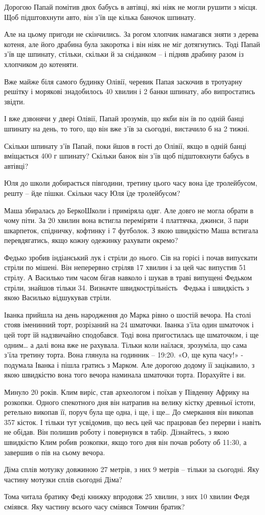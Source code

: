 Дорогою Папай помітив двох бабусь в автівці, які ніяк не могли рушити
з місця. Щоб підштовхнути авто, він з’їв ще кілька баночок шпинату.

Але на цьому пригоди не скінчились. За рогом хлопчик намагався зняти
з дерева котеня, але його драбина була закоротка і він ніяк не міг
дотягнутись. Тоді Папай з’їв ще шпинату, стільки, скільки й
за сніданком – і підняв драбину разом із хлопчиком до котеняти.

Вже майже біля самого будинку Олівії, черевик Папая заскочив в тротуарну
решітку і морякові знадобилось 40 хвилин і 2 банки шпинату,
або випростатись звідти.

І вже дзвонячи у двері Олівії, Папай зрозумів, що якби він їв по одній
банці шпинату на день, то того, що він вже з’їв за сьогодні,
вистачило б на 2 тижні.

Скільки шпинату з’їв Папай, поки йшов в гості до Олівії, якщо в одній
банці вміщається 400 г шпинату?
Скільки банок він з’їв щоб підштовхнути бабусь в автівці?


\problem
Юля до школи добирається півгодини,
третину цього часу вона їде тролейбусом, решту – йде пішки.
Скільки часу Юля їде тролейбусом?


\problem
Маша збиралась до БеркоШколи і приміряла одяг.
Але довго не могла обрати в чому піти.
За 20 хвилин вона встигла переміряти 4 платтячка, джинси, 3 пари шкарпеток,
спідничку, кофтинку і 7 футболок.
З якою швидкістю Маша встигала перевдягатись,
якщо кожну одежинку рахувати окремо?


\problem
Федько зробив індіанський лук і стріли до нього.
Сів на горісі і почав випускати стріли по мішені.
Він неперервно стріляв 17 хвилин і за цей час випустив 51 стрілу.
А Василько тим часом бігав навколо і шукав в траві випущені Федьком стріли,
знайшов тільки 34.
Визначте швидкострільність  Федька і швидкість з якою Василько
відшукував стріли.


\problem
Іванка прийшла на день народження до Марка рівно о шостій вечора.
На столі стояв іменинний торт, розрізаний на 24 шматочки.
Іванка з’їла один шматочок і цей торт їй надзвичайно сподобався.
Тоді вона пригостилась ще шматочком, і ще одним… а далі вона вже не рахувала.
Тільки коли наїлася, зрозуміла, що сама з’їла третину торта.
Вона глянула на годинник – 19:20.
«О, ще купа часу!» - подумала Іванка і пішла гратись з Марком.
Але дорогою додому її зацікавило, з якою швидкістю вона того
вечора наминала шматочки торта. Порахуйте і ви.


\problem
Минуло 20 років. Клим виріс, став археологом і поїхав у Південну Африку
на розкопки. Одного спекотного дня він натрапив на велику кістку
древньої істоти, ретельно викопав її, поруч була ще одна, і ще, і ще…
До смеркання він викопав 357 кісток. І тільки тут усвідомив, що весь
цей час працював без перерви і навіть не обідав. Він полишив роботу
і повернувся в табір. Дізнайтесь, з якою швидкістю Клим робив розкопки,
якщо того дня він почав роботу об 11:30, а завершив о пів на сьому вечора.


\problem
Діма сплів мотузку довжиною 27 метрів, з них 9 метрів – тільки за сьогодні.
Яку частину мотузки сплів сьогодні Діма?


\problem
Тома читала братику Феді книжку впродовж 25 хвилин,
з них 10 хвилин Федя сміявся.
Яку частину всього часу сміявся Томчин братик?
